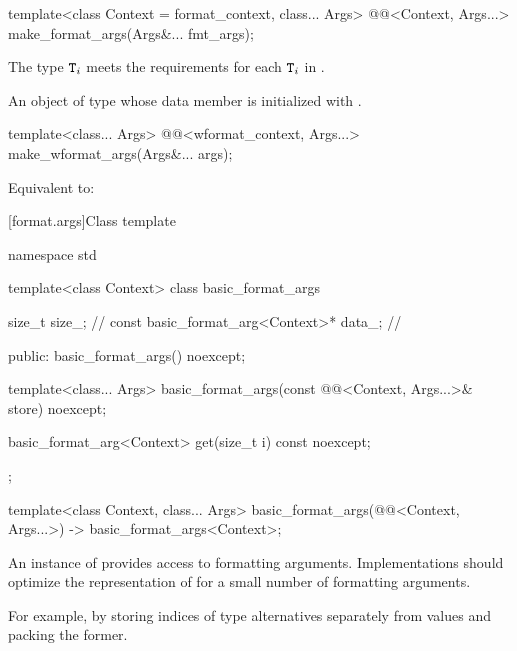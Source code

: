 %
\begin{itemdecl}
template<class Context = format_context, class... Args>
  @@<Context, Args...> make_format_args(Args&... fmt_args);
\end{itemdecl}

\begin{itemdescr}
\pnum
\expects
The type
$\texttt{\protect T}_i$\tcode{>>}\linebreak{}
meets the  requirements
for each $\texttt{\protect T}_i$ in .

\pnum
\returns
An object of type 
whose  data member is initialized with
.
\end{itemdescr}

%
\begin{itemdecl}
template<class... Args>
  @@<wformat_context, Args...> make_wformat_args(Args&... args);
\end{itemdecl}

\begin{itemdescr}
\pnum
\effects
Equivalent to:
\end{itemdescr}

[format.args]{Class template }

\begin{codeblock}
namespace std {
  template<class Context>
  class basic_format_args {
    size_t size_;                               // \expos
    const basic_format_arg<Context>* data_;     // \expos

  public:
    basic_format_args() noexcept;

    template<class... Args>
      basic_format_args(const @@<Context, Args...>& store) noexcept;

    basic_format_arg<Context> get(size_t i) const noexcept;
  };

  template<class Context, class... Args>
    basic_format_args(@@<Context, Args...>) -> basic_format_args<Context>;
}
\end{codeblock}

\pnum
An instance of  provides access to formatting
arguments.
Implementations should
optimize the representation of 
for a small number of formatting arguments.
\begin{note}
For example, by storing indices of type alternatives separately from values
and packing the former.
\end{note}

